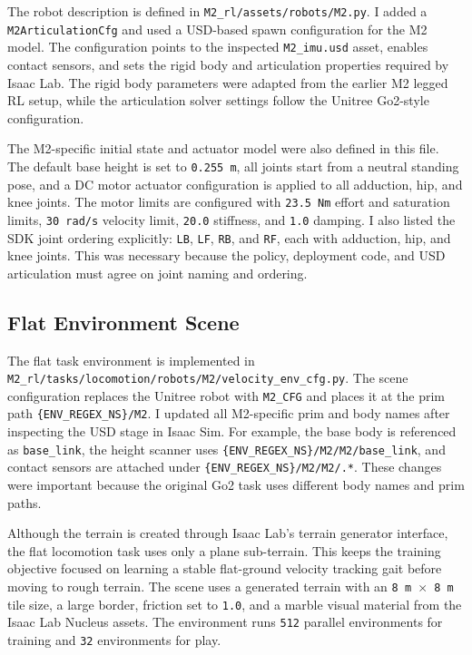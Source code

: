 The robot description is defined in \texttt{M2\_rl/assets/robots/M2.py}. I added a
\texttt{M2ArticulationCfg} and used a USD-based spawn configuration for the M2 model. The
configuration points to the inspected \texttt{M2\_imu.usd} asset, enables contact sensors, and sets the
rigid body and articulation properties required by Isaac Lab. The rigid body parameters were adapted from
the earlier M2 legged RL setup, while the articulation solver settings follow the Unitree Go2-style
configuration.

The M2-specific initial state and actuator model were also defined in this file. The default base
height is set to \texttt{0.255 m}, all joints start from a neutral standing pose, and a DC motor actuator
configuration is applied to all adduction, hip, and knee joints. The motor limits are configured with
\texttt{23.5 Nm} effort and saturation limits, \texttt{30 rad/s} velocity limit, \texttt{20.0} stiffness,
and \texttt{1.0} damping. I also listed the SDK joint ordering explicitly:
\texttt{LB}, \texttt{LF}, \texttt{RB}, and \texttt{RF}, each with adduction, hip, and knee joints. This
was necessary because the policy, deployment code, and USD articulation must agree on joint naming and
ordering.

\subsection{Flat Environment Scene}

The flat task environment is implemented in
\texttt{M2\_rl/tasks/locomotion/robots/M2/velocity\_env\_cfg.py}. The scene configuration replaces
the Unitree robot with \texttt{M2\_CFG} and places it at the prim path
\texttt{\{ENV\_REGEX\_NS\}/M2}. I updated all M2-specific prim and body names after inspecting the
USD stage in Isaac Sim. For example, the base body is referenced as \texttt{base\_link}, the height scanner
uses \texttt{\{ENV\_REGEX\_NS\}/M2/M2/base\_link}, and contact sensors are attached under
\texttt{\{ENV\_REGEX\_NS\}/M2/M2/.*}. These changes were important because the original Go2 task
uses different body names and prim paths.

Although the terrain is created through Isaac Lab's terrain generator interface, the flat locomotion task
uses only a plane sub-terrain. This keeps the training objective focused on learning a stable flat-ground
velocity tracking gait before moving to rough terrain. The scene uses a generated terrain with an
\texttt{8 m \(\times\) 8 m} tile size, a large border, friction set to \texttt{1.0}, and a marble visual
material from the Isaac Lab Nucleus assets. The environment runs \texttt{512} parallel environments for
training and \texttt{32} environments for play.

